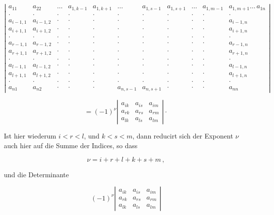 \documentclass[11pt]{article}
\begin{document}
\[
\left|
\begin{array}{ccccccccccc}
a_{11} & a_{22} & \dots & a_{1,k-1} & a_{1,k+1} & \dots & a_{1,s-1} & a_{1,s+1} & \dots & a_{1,m-1} & a_{1,m+1} \dots\, a_{1n} \\
\cdot & \cdot & \cdot & \cdot & \cdot & \cdot & \cdot & \cdot & \cdot & \cdot & \cdot \\
a_{i-1,1} & a_{i-1,2} & \cdot & \cdot & \cdot & \cdot & \cdot & \cdot & \cdot & \cdot & a_{i-1,n} \\
a_{i+1,1} & a_{i+1,2} & \cdot & \cdot & \cdot & \cdot & \cdot & \cdot & \cdot & \cdot & a_{i+1,n} \\
\cdot & \cdot & \cdot & \cdot & \cdot & \cdot & \cdot & \cdot & \cdot & \cdot & \cdot \\
a_{r-1,1} & a_{r-1,2} & \cdot & \cdot & \cdot & \cdot & \cdot & \cdot & \cdot & \cdot & a_{r-1,n} \\
a_{r+1,1} & a_{r+1,2} & \cdot & \cdot & \cdot & \cdot & \cdot & \cdot & \cdot & \cdot & a_{r+1,n} \\
\cdot & \cdot & \cdot & \cdot & \cdot & \cdot & \cdot & \cdot & \cdot & \cdot & \cdot \\
a_{l-1,1} & a_{l-1,2} & \cdot & \cdot & \cdot & \cdot & \cdot & \cdot & \cdot & \cdot & a_{l-1,n} \\
a_{l+1,1} & a_{l+1,2} & \cdot & \cdot & \cdot & \cdot & \cdot & \cdot & \cdot & \cdot & a_{l+1,n} \\
\cdot & \cdot & \cdot & \cdot & \cdot & \cdot & \cdot & \cdot & \cdot & \cdot & \cdot \\
a_{n1} & a_{n2} & \cdot & \cdot & \cdot & a_{n,s-1} & a_{n,s+1} & \cdot & \cdot & \cdot & a_{nn}
\end{array}
\right|
\]

\[
= (-1)^\nu \left|\begin{array}{ccc} a_{ik} & a_{is} & a_{im} \\ a_{rk} & a_{rs} & a_{rm} \\
a_{lk} & a_{ls} & a_{lm} \end{array}\right| \cdot
\]

Ist hier wiederum $i<r<l$, und $k<s<m$, dann reducirt sich der Exponent $\nu$ auch hier auf die
Summe der Indices, so dass

\[
\nu = i+r+l+k+s+m\,,
\]

und die Determinante

\[
(-1)^\nu \left|\begin{array}{ccc} a_{ik} & a_{is} & a_{im} \\ a_{rk} & a_{rs} & a_{rm} \\
a_{lk} & a_{ls} & a_{lm} \end{array}\right|
\]
\end{document}
